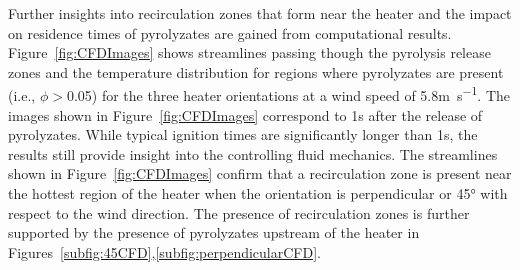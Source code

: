     Further insights into recirculation zones that form near the heater and the impact on residence times of pyrolyzates are gained from computational results. Figure~\ref{fig:CFDImages} shows streamlines passing though the pyrolysis release zones and the temperature distribution for regions where pyrolyzates are present (i.e., $\phi>$0.05) for the three heater orientations at a wind speed of 5.8\si{\meter\per\second}. The images shown in Figure~\ref{fig:CFDImages} correspond to 1\si{\second} after the release of pyrolyzates. While typical ignition times are significantly longer than 1\si{\second}, the results still provide insight into the controlling fluid mechanics. The streamlines shown in Figure~\ref{fig:CFDImages} confirm that a recirculation zone is present near the hottest region of the heater when the orientation is perpendicular or 45\si{\degree} with respect to the wind direction. The presence of recirculation zones is further supported by the presence of pyrolyzates upstream of the heater in Figures~\ref{subfig:45CFD},\ref{subfig:perpendicularCFD}.
